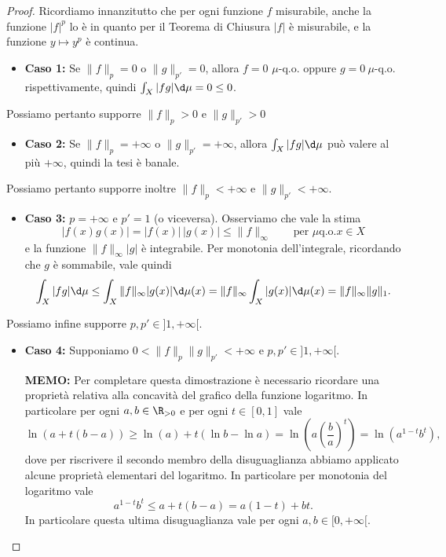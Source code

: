 \begin{proof}
    Ricordiamo innanzitutto che per ogni funzione $f$ misurabile, anche la funzione $|f|^p$ lo è in quanto per il Teorema di Chiusura $|f|$ è misurabile, e la funzione $y\mapsto y^p$ è continua.
    \begin{itemize}
        \item \textbf{Caso 1:} Se $\|f\|_p = 0$ o $\|g\|_{p'} = 0$, allora $f = 0$ $\mu$-q.o. oppure $g = 0\ \mu$-q.o. rispettivamente, quindi $\int_X|fg|\d\mu = 0\leq 0$.
    \end{itemize}
    Possiamo pertanto supporre $\|f\|_p > 0$ e $\|g\|_{p'} > 0$
    \begin{itemize}
        \item \textbf{Caso 2:} Se $\|f\|_p = +\infty$ o $\|g\|_{p'} = +\infty$, allora $\int_X|fg|\d\mu$ può valere al più $+\infty$, quindi la tesi è banale. 
    \end{itemize}
    Possiamo pertanto supporre inoltre $\|f\|_p < +\infty$ e $\|g\|_{p'} <+\infty$.
    \begin{itemize}
        \item \textbf{Caso 3:} $p = +\infty$ e $p'=1$ (o viceversa). Osserviamo che vale la stima
            \[|f(x)g(x)| = |f(x)|\, |g(x)|\leq \|f\|_\infty\qquad \text{per }\mu\text{q.o.}x\in X\]
            e la funzione $\|f\|_\infty |g|$ è integrabile. Per monotonia dell'integrale, ricordando che $g$ è sommabile, vale quindi
            \[\int_X|fg|\d \mu \leq \int_X\|f\|_\infty |g(x)|\d \mu(x) = \|f\|_\infty \int_X|g(x)|\d \mu(x) = \|f\|_\infty \|g\|_1.\]
    \end{itemize}
    Possiamo infine supporre $p,p'\in ]1,+\infty[$.
    \begin{itemize}
        \item \textbf{Caso 4:} Supponiamo $0<\|f\|_p\|g\|_{p'}<+\infty$ e $p,p'\in ]1,+\infty[$. 
        
        \textbf{MEMO:} Per completare questa dimostrazione è necessario ricordare una proprietà relativa alla concavità del grafico della funzione logaritmo. In particolare per ogni $a,b\in \R_{>0}$ e per ogni $t\in [0,1]$ vale 
        \[\ln(a+t(b-a)) \geq \ln(a) + t(\ln b-\ln a) = \ln\left(a\left(\frac{b}{a}\right)^t\right) = \ln(a^{1-t}b^t),\]
        dove per riscrivere il secondo membro della disuguaglianza abbiamo applicato alcune proprietà elementari del logaritmo. In particolare per monotonia del logaritmo vale
        \[a^{1-t}b^t \leq a+t(b-a) = a(1-t)+bt.\]
        In particolare questa ultima disuguaglianza vale per ogni $a,b\in [0,+\infty[$.


\end{itemize}
\end{proof}
